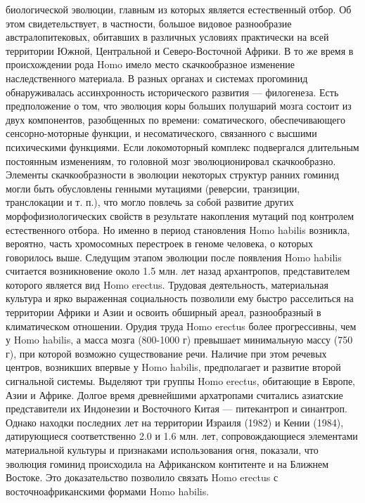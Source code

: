 \documentclass[12pt]{article}
\begin{document}
биологической  эволюции,  главным  из  которых  является  естественный  отбор.  Об  этом  свидетельствует,  в
частности, большое видовое разнообразие австралопитековых, обитавших в различных условиях практически
на всей территории Южной, Центральной и Северо-Восточной Африки. В то же время в происхождении рода
Homo имело место скачкообразное изменение наследственного материала.
В  разных  органах  и  системах  прогоминид  обнаруживалась  ассинхронность  исторического  развития  --- филогенеза.  Есть  предположение  о  том,  что  эволюция  коры  больших  полушарий  мозга  состоит  из  двух
компонентов,  разобщенных  по  времени:  соматического,  обеспечивающего  сенсорно-моторные  функции,  и
несоматического, связанного с высшими психическими функциями. Если локомоторный комплекс подвергался
длительным  постоянным  изменениям,  то  головной  мозг  эволюционировал  скачкообразно.  Элементы
скачкообразности в
эволюции  некоторых  структур  ранних  гоминид  могли  быть  обусловлены  генными  мутациями  (реверсии,
транзиции, транслокации и т. п.), что могло повлечь за собой развитие других морфофизиологических свойств в
результате накопления мутаций под контролем естественного отбора. Но именно в период становления Homo
habilis возникла, вероятно, часть хромосомных перестроек в геноме человека, о которых говорилось выше. 
Следущим этапом эволюции после появления Homo habilis считается возникновение около 1.5 млн. лет назад
архантропов,  представителем  которого  является  вид  Homo  erectus.  Трудовая  деятельность,  материальная
культура и ярко выраженная социальность позволили ему быстро расселиться на территории Африки и Азии и
освоить  обширный  ареал,  разнообразный  в  климатическом  отношении.  Орудия  труда  Homo  erectus  более
прогрессивны, чем у Homo habilis, а масса мозга (800-1000 г) превышает минимальную массу (750 г), при
которой возможно существование речи. Наличие при этом речевых центров, возникших впервые у Homo habilis,
предполагает и развитие второй сигнальной системы.
Выделяют  три  группы  Homo  erectus,  обитающие  в  Европе,  Азии  и  Африке.  Долгое  время  древнейшими
архатропами считались азиатские представители их Индонезии и Восточного Китая --- питекантроп и синантроп.
Однако находки последних лет на территории Израиля (1982) и Кении (1984), датирующиеся соответственно 2.0
и  1.6  млн. лет,  сопровождающиеся  элементами  материальной культуры и  признаками использования огня,
показали,  что  эволюция  гоминид  происходила  на  Африканском  контитенте  и  на  Ближнем  Востоке.  Это
доказательство позволило связать Homo erectus с восточноафриканскими формами Homo habilis.
\end{document}
